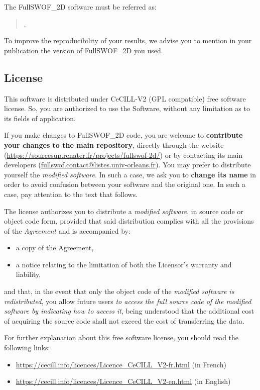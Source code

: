 \documentclass[a4paper, 11pt]{article}
\makeatletter
\newcommand{\FullSWOF}{FullSWOF\_2D}
\newcommand{\contactFS}{\href{mailto:fullswof.contact@listes.univ-orleans.fr}{fullswof.contact@listes.univ-orleans.fr}}
\newcommand{\MainWebSite}{\url{https://sourcesup.renater.fr/projects/fullswof-2d/}}
\renewcommand\bibentry[1]{\nocite{#1}{\frenchspacing
     \@nameuse{BR@r@#1\@extra@b@citeb}}}
\makeatother
\begin{document}
The \FullSWOF{} software must be referred as:
\begin{quote}
	\nobibliography*
	\bibentry{Delestre17}.
\end{quote}

To improve the reproducibility of your results, we advise you to mention in your publication the version of \FullSWOF{} you used.

\subsection{License}\label{sec:license}
This software is distributed under CeCILL-V2 (GPL compatible) free software license.
So, you are  authorized to use the Software, without any limitation as to its fields of application.

If you make changes to \FullSWOF{} code, you are welcome to \textbf{contribute your changes to the main repository}, directly through the website (\MainWebSite) or by contacting its main developers (\contactFS).
You may prefer to distribute yourself the \emph{modified software}.
In such a case, we ask you to \textbf{change its name} in order to avoid confusion between your software and the original one.
In such a case, pay attention to the text that follows.

The license authorizes you to distribute a \emph{modified software}, in source code or object code form, provided that said distribution complies with all the provisions of the \emph{Agreement} and is accompanied by:
\begin{itemize}
	\item a copy of the Agreement,
	\item a notice relating to the limitation of both the Licensor's warranty and liability,
\end{itemize}
and that, in the event that only the object code of the \emph{modified software is redistributed}, you allow future users \emph{to access the full source code of the modified software by indicating how to access it}, being understood that the additional cost of acquiring the source code shall not exceed the cost of transferring the data.

For further explanation about this free software license, you should read the following links:
\begin{itemize}
	\item \url{https://cecill.info/licences/Licence_CeCILL_V2-fr.html} (in French)
	\item \url{https://cecill.info/licences/Licence_CeCILL_V2-en.html} (in English)
\end{itemize}
\end{document}
